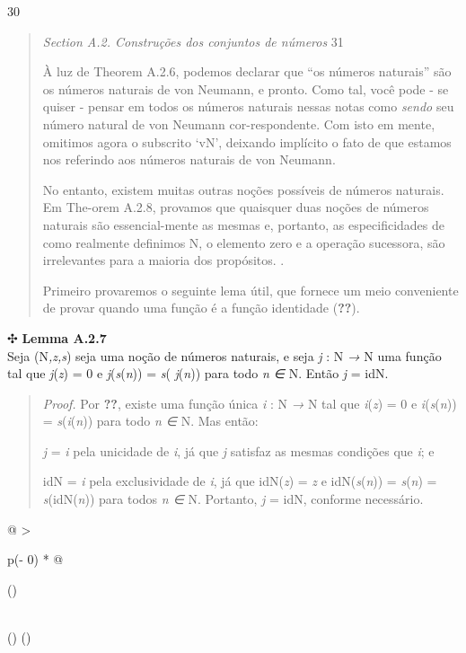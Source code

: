 \documentclass[
]{article}
\begin{document}
30

\begin{quote}
\emph{Section A.2. Construções dos conjuntos de números} 31

À luz de Theorem A.2.6, podemos declarar que ``os números naturais'' são
os números naturais de von Neumann, e pronto. Como tal, você pode - se
quiser - pensar em todos os números naturais nessas notas como
\emph{sendo} seu número natural de von Neumann cor-respondente. Com isto
em mente, omitimos agora o subscrito `vN', deixando implícito o fato de
que estamos nos referindo aos números naturais de von Neumann.

No entanto, existem muitas outras noções possíveis de números naturais.
Em The-orem A.2.8, provamos que quaisquer duas noções de números
naturais são essencial-mente as mesmas e, portanto, as especificidades
de como realmente definimos N, o elemento zero e a operação sucessora,
são irrelevantes para a maioria dos propósitos. .

Primeiro provaremos o seguinte lema útil, que fornece um meio
conveniente de provar quando uma função é a função identidade
(\textbf{??}).
\end{quote}

✣ \textbf{Lemma A.2.7}\\
Seja (N\emph{,z,s}) seja uma noção de números naturais, e seja \emph{j}
: N \emph{→} N uma função tal que \emph{j}(\emph{z}) = 0 e
\emph{j}(\emph{s}(\emph{n})) = \emph{s}( \emph{j}(\emph{n})) para todo
\emph{n ∈} N. Então \emph{j} = idN.

\begin{quote}
\emph{Proof.} Por \textbf{??}, existe uma função única \emph{i} : N
\emph{→} N tal que \emph{i}(\emph{z}) = 0 e \emph{i}(\emph{s}(\emph{n}))
= \emph{s}(\emph{i}(\emph{n})) para todo \emph{n ∈} N. Mas então:

\emph{j} = \emph{i} pela unicidade de \emph{i}, já que \emph{j} satisfaz
as mesmas condições que \emph{i}; e

idN = \emph{i} pela exclusividade de \emph{i}, já que idN(\emph{z}) =
\emph{z} e idN(\emph{s}(\emph{n})) = \emph{s}(\emph{n}) =
\emph{s}(idN(\emph{n})) para todos \emph{n ∈} N. Portanto, \emph{j} =
idN, conforme necessário.
\end{quote}

\begin{longtable}[]{@{}
  >{\raggedright\arraybackslash}p{(\columnwidth - 0\tabcolsep) * }@{}}
\toprule()
\begin{minipage}[b]{\linewidth}\raggedright
\end{minipage} \\
\midrule()
\endhead
\bottomrule()
\end{longtable}
\end{document}
